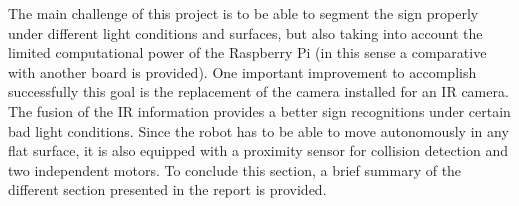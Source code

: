 The main challenge of this project is to be able to segment the sign properly under different light conditions and surfaces, but also taking into account the limited computational power of the Raspberry Pi (in this sense a comparative with another board is provided). One important improvement to accomplish successfully this goal is the replacement of the camera installed for an IR camera. The fusion of the IR information provides a better sign recognitions under certain bad light conditions. Since the robot has to be able to move autonomously in any flat surface, it is also equipped with a proximity sensor for collision detection and two independent motors.
To conclude this section, a brief summary of the different section presented in the report is provided. 


